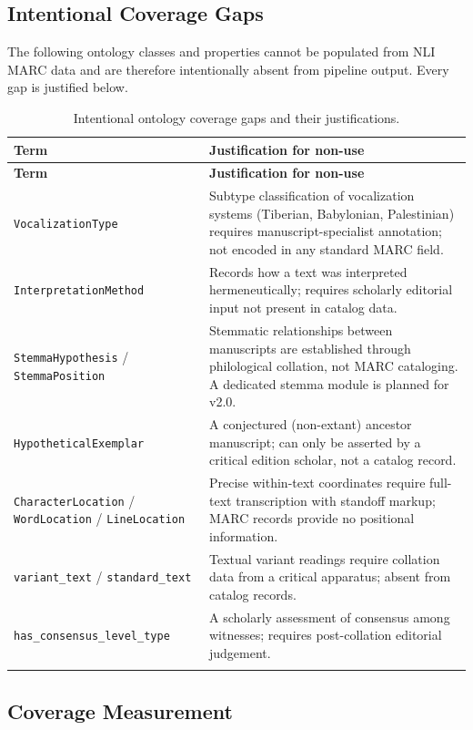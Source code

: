\documentclass[12pt]{article}
\newcommand{\code}[1]{\texttt{#1}}
\begin{document}
\subsection{Intentional Coverage Gaps}

The following ontology classes and properties cannot be populated from NLI MARC data and are therefore intentionally absent from pipeline output. Every gap is justified below.

\begin{longtable}{|p{4.5cm}|p{8.5cm}|}
\hline
\textbf{Term} & \textbf{Justification for non-use} \\
\hline
\endfirsthead
\hline
\textbf{Term} & \textbf{Justification for non-use} \\
\hline
\endhead
\hline
\endfoot
\code{VocalizationType} & Subtype classification of vocalization systems (Tiberian, Babylonian, Palestinian) requires manuscript-specialist annotation; not encoded in any standard MARC field. \\
\hline
\code{InterpretationMethod} & Records how a text was interpreted hermeneutically; requires scholarly editorial input not present in catalog data. \\
\hline
\code{StemmaHypothesis} / \code{StemmaPosition} & Stemmatic relationships between manuscripts are established through philological collation, not MARC cataloging. A dedicated stemma module is planned for v2.0. \\
\hline
\code{HypotheticalExemplar} & A conjectured (non-extant) ancestor manuscript; can only be asserted by a critical edition scholar, not a catalog record. \\
\hline
\code{CharacterLocation} / \code{WordLocation} / \code{LineLocation} & Precise within-text coordinates require full-text transcription with standoff markup; MARC records provide no positional information. \\
\hline
\code{variant\_text} / \code{standard\_text} & Textual variant readings require collation data from a critical apparatus; absent from catalog records. \\
\hline
\code{has\_consensus\_level\_type} & A scholarly assessment of consensus among witnesses; requires post-collation editorial judgement. \\
\hline
\caption{Intentional ontology coverage gaps and their justifications.}
\label{tbl:coverage-gaps}
\end{longtable}

\subsection{Coverage Measurement}
\end{document}
